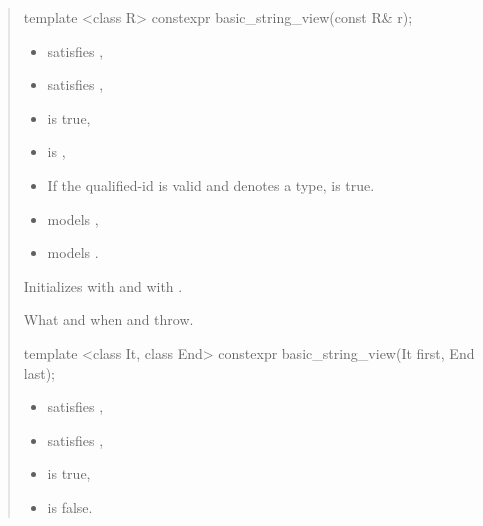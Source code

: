 \documentclass{wg21}
\begin{document}
\begin{quote}
\begin{addedblock}
\begin{itemdecl}
template <class R>
constexpr basic_string_view(const R& r);

\end{itemdecl}

\begin{itemdescr}
    \constraints
    \begin{itemize}
        \item {} satisfies ,
        \item {} satisfies ,
        \item {} is true,
        \item {} is ,
        \item If the qualified-id  is valid and denotes a type,  is true.
    \end{itemize}
 
	\expects
	 \begin{itemize}
		\item {} models ,
		\item {} models .
	\end{itemize}

    \effects
    Initializes  with  and  with .


    \throws
    What and when  and  throw.



\end{itemdescr}

\begin{itemdecl}
template <class It, class End>
constexpr basic_string_view(It first, End last);

\end{itemdecl}

\begin{itemdescr}
    \constraints
    \begin{itemize}
        \item {} satisfies ,
        \item {} satisfies ,
        \item {} is true,
        \item {} is false.
    \end{itemize}


\end{itemdescr}
\end{addedblock}
\end{quote}
\end{document}
